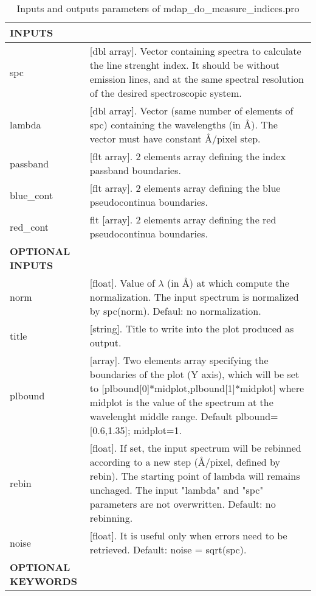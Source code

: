 \documentclass[11pt]{book}
\begin{document}
\begin{center}
\begin{longtable}{p{2.7cm}| p{11.1cm}}
\caption{Inputs and outputs parameters of mdap\_do\_measure\_indices.pro} \label{dap_tab:mdap_do_measure_indices} \\
\hline
\endfirsthead
\hline
\endhead
\hline
\endlastfoot
\hline
{\bf  INPUTS} & \\
\hline
%
spc    &  [dbl array].  Vector containing  spectra to calculate the line strenght index. It should be without emission lines, and at the same 
                         spectral resolution of the desired spectroscopic system.\\
%
lambda &  [dbl array].  Vector (same number of elements of spc) containing the wavelengths (in \AA). The vector must have constant \AA/pixel step.\\
%
passband & [flt array].    2 elements array defining the index passband boundaries.\\
%
blue\_cont &[flt array].    2 elements array defining the blue pseudocontinua boundaries.\\
%
red\_cont  &flt [array].    2 elements array defining the red pseudocontinua boundaries.\\
\hline 
{\bf OPTIONAL INPUTS} & \\
norm    &  [float].    Value of $\lambda$ (in \AA) at which compute the normalization. The input spectrum is normalized by spc(norm). Defaul: no normalization.\\
%
title   &  [string].   Title to write into the plot produced as output. \\
%
plbound &  [array].    Two elements array specifying the boundaries of
                     the plot (Y axis), which will be set to [plbound[0]*midplot,plbound[1]*midplot]
                     where midplot is the value of the spectrum at
                     the wavelenght middle range. Default plbound=[0.6,1.35]; midplot=1.\\
%
rebin   &  [float].  If set, the input spectrum will be rebinned according to a new step (\AA/pixel, defined by
                     rebin). The starting point of lambda will remains  unchaged. The input "lambda" and "spc" parameters are not overwritten.
                     Default: no rebinning.\\
%
noise    & [float].   It is useful only when errors need to be retrieved. Default: noise = sqrt(spc).\\ 
\hline
{\bf OPTIONAL KEYWORDS}  & \\

\end{longtable}
\end{center}
\end{document}
